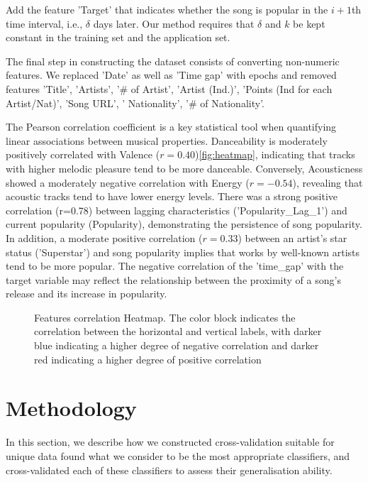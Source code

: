 \documentclass{article}
\begin{document}
Add the feature 'Target' that indicates whether the song is popular in the $i+1$th time interval, i.e., $\delta$ days later. Our method requires that $\delta$ and $k$ be kept constant in the training set and the application set.

The final step in constructing the dataset consists of converting non-numeric features. We replaced 'Date' as well as 'Time gap' with epochs and removed features 'Title', 'Artists', '\# of Artist', 'Artist (Ind.)', 'Points (Ind for each Artist/Nat)', 'Song URL', ' Nationality', '\# of Nationality'.

The Pearson correlation coefficient is a key statistical tool when quantifying linear associations between musical properties. Danceability is moderately positively correlated with Valence ($r=0.40$)\autoref{fig:heatmap}, indicating that tracks with higher melodic pleasure tend to be more danceable. Conversely, Acousticness showed a moderately negative correlation with Energy ($r=-0.54$), revealing that acoustic tracks tend to have lower energy levels. There was a strong positive correlation (r=0.78) between lagging characteristics ('Popularity\_Lag\_1') and current popularity (Popularity), demonstrating the persistence of song popularity. In addition, a moderate positive correlation ($r=0.33$) between an artist's star status ('Superstar') and song popularity implies that works by well-known artists tend to be more popular. The negative correlation of the 'time\_gap' with the target variable may reflect the relationship between the proximity of a song's release and its increase in popularity.

\begin{figure}[h]
  \centering
  
  \captionsetup{labelformat=default}
  \caption{Features correlation Heatmap. The color block indicates the correlation between the horizontal and vertical labels, with darker blue indicating a higher degree of negative correlation and darker red indicating a higher degree of positive correlation}
  \label{fig:heatmap}
\end{figure}

\section{Methodology}
In this section, we describe how we constructed cross-validation suitable for unique data found what we consider to be the most appropriate classifiers, and cross-validated each of these classifiers to assess their generalisation ability.
\end{document}
